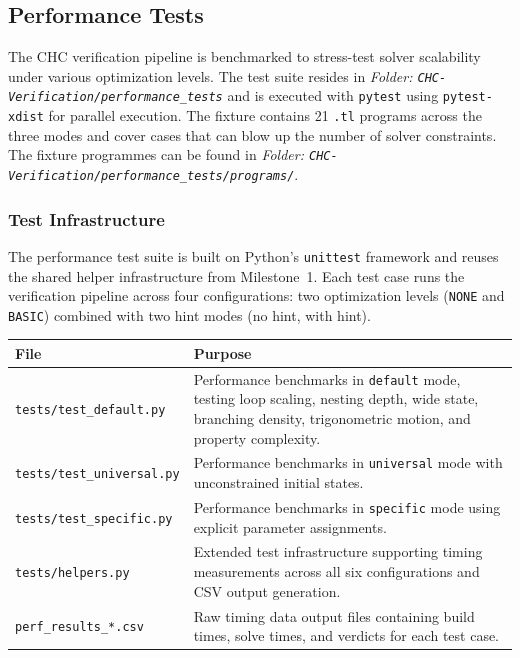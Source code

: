 \subsection*{Performance Tests}
\label{sec:performance_tests}

The CHC verification pipeline is benchmarked to stress-test solver scalability under various optimization levels. 
The test suite resides in \noindent\textit{\small Folder: \texttt{CHC-Verification/performance\_tests}} and is executed with \texttt{pytest} using \texttt{pytest-xdist} for parallel execution.
The fixture contains 21 \texttt{.tl} programs across the three modes and cover cases that can blow up the number of solver constraints. 
The fixture programmes can be found in \noindent\textit{\small Folder: \texttt{CHC-Verification/performance\_tests/programs/}}.


\subsubsection*{Test Infrastructure}

The performance test suite is built on Python's \texttt{unittest} framework and reuses the shared helper infrastructure from Milestone~1. Each test case runs the verification pipeline across four configurations: two optimization levels (\texttt{NONE} and \texttt{BASIC}) combined with two hint modes (no hint, with hint).

\begin{longtable}{p{} p{}}
\toprule
\textbf{File} & \textbf{Purpose} \\
\midrule
\texttt{tests/test\_default.py} & Performance benchmarks in \texttt{default} mode, testing loop scaling, nesting depth, wide state, branching density, trigonometric motion, and property complexity. \\
\texttt{tests/test\_universal.py} & Performance benchmarks in \texttt{universal} mode with unconstrained initial states. \\
\texttt{tests/test\_specific.py} & Performance benchmarks in \texttt{specific} mode using explicit parameter assignments. \\
\texttt{tests/helpers.py} & Extended test infrastructure supporting timing measurements across all six configurations and CSV output generation. \\
\texttt{perf\_results\_*.csv} & Raw timing data output files containing build times, solve times, and verdicts for each test case. \\
\bottomrule
\end{longtable}

